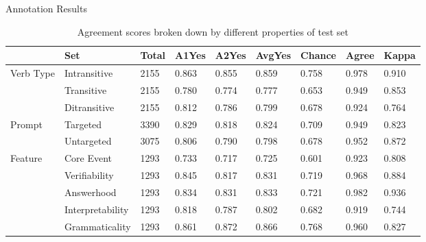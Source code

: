 \documentclass[final,t]{beamer}
\begin{document}
\begin{frame}{}
\begin{columns}[t]
\begin{column}{.33\linewidth}
\begin{block}{Annotation Results}
\begin{center}
\begin{minipage}{.85\textwidth}
\vspace{1em}
\begin{table}[htb!]
\begin{center}
\setlength{\tabcolsep}{0.65em}
\begin{tabular}{|l|l|l|l|l|l||l|l||l|}
\hline
& Set	& Total	& A1Yes & A2Yes & AvgYes & Chance & Agree & Kappa \\
\hline
\hline
\multirow{3}{*}{Verb Type}& Intransitive & 2155 & 0.863 & 0.855 & 0.859 & 0.758 & 0.978 & 0.910 \\
\cline{2-9}
& Transitive & 2155 & 0.780 & 0.774 & 0.777 & 0.653 & 0.949 & 0.853 \\
\cline{2-9}
& Ditransitive & 2155 & 0.812 & 0.786 & 0.799 & 0.678 & 0.924 & 0.764 \\ 
\hline
\hline
\multirow{2}{*}{Prompt} & Targeted & 3390 & 0.829 & 0.818 & 0.824 & 0.709 & 0.949 & 0.823 \\
\cline{2-9}
& Untargeted & 3075 & 0.806 & 0.790 & 0.798 & 0.678 & 0.952 & 0.872 \\
\hline
\hline
\multirow{5}{*}{Feature} & Core Event & 1293 & 0.733 & 0.717 & 0.725 & 0.601 & 0.923 & 0.808 \\
\cline{2-9}
& Verifiability & 1293 & 0.845 & 0.817 & 0.831 & 0.719 & 0.968 & 0.884 \\
\cline{2-9}
& Answerhood & 1293 & 0.834 & 0.831 & 0.833 & 0.721 & 0.982 & 0.936 \\
\cline{2-9}
& Interpretability & 1293 & 0.818 & 0.787 & 0.802 & 0.682 & 0.919 & 0.744 \\
\cline{2-9}
& Grammaticality & 1293 & 0.861 & 0.872 & 0.866 & 0.768 & 0.960 & 0.827 \\
\hline
\end{tabular}
\caption{\label{tab:agreement} Agreement scores broken down by different properties of test set}
\end{center}
\end{table}
\vspace{1em}


\end{minipage}
\end{center}
\end{block}
\end{column}
\end{columns}
\end{frame}
\end{document}

